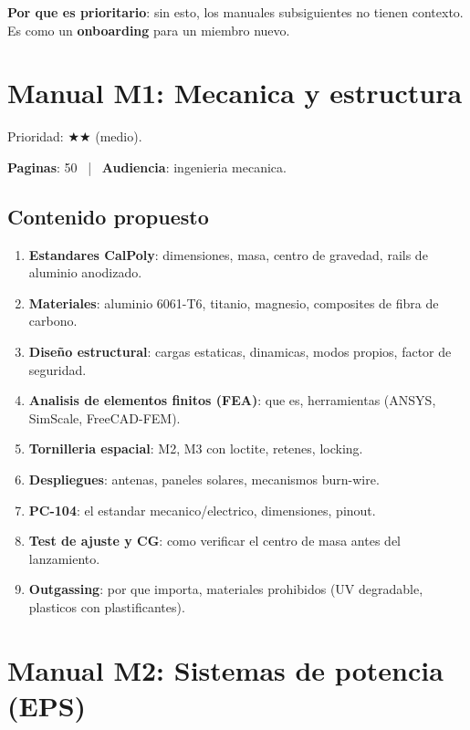 \documentclass[11pt,a4paper,oneside]{report}
\begin{document}
\textbf{Por que es prioritario}: sin esto, los manuales subsiguientes no
tienen contexto. Es como un \textbf{onboarding} para un miembro nuevo.

\chapter{Manual M1: Mecanica y estructura}

\begin{prioritario}
Prioridad: $\bigstar\bigstar$ (medio).
\end{prioritario}

\textbf{Paginas}: 50 ~|~ \textbf{Audiencia}: ingenieria mecanica.

\section{Contenido propuesto}

\begin{enumerate}[leftmargin=2em]
  \item \textbf{Estandares CalPoly}: dimensiones, masa, centro de gravedad,
        rails de aluminio anodizado.
  \item \textbf{Materiales}: aluminio 6061-T6, titanio, magnesio,
        composites de fibra de carbono.
  \item \textbf{Diseño estructural}: cargas estaticas, dinamicas, modos
        propios, factor de seguridad.
  \item \textbf{Analisis de elementos finitos (FEA)}: que es, herramientas
        (ANSYS, SimScale, FreeCAD-FEM).
  \item \textbf{Tornilleria espacial}: M2, M3 con loctite, retenes, locking.
  \item \textbf{Despliegues}: antenas, paneles solares, mecanismos burn-wire.
  \item \textbf{PC-104}: el estandar mecanico/electrico, dimensiones, pinout.
  \item \textbf{Test de ajuste y CG}: como verificar el centro de masa antes
        del lanzamiento.
  \item \textbf{Outgassing}: por que importa, materiales prohibidos
        (UV degradable, plasticos con plastificantes).
\end{enumerate}

\chapter{Manual M2: Sistemas de potencia (EPS)}
\end{document}

